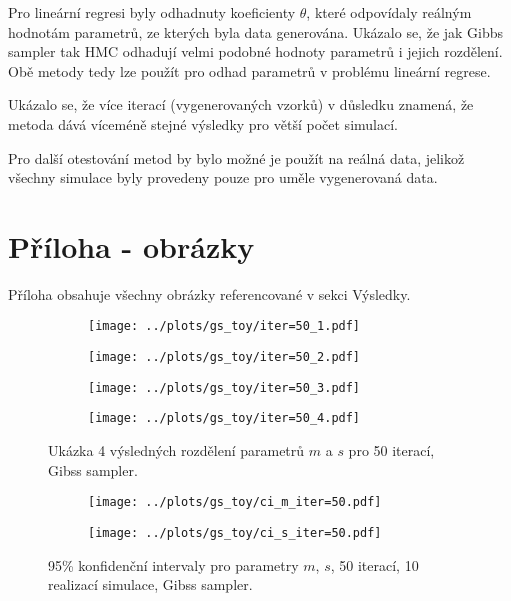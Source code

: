 \documentclass[11pt,oneside,american,czech]{article}
\begin{document}
Pro lineární regresi byly odhadnuty koeficienty $\theta$, které odpovídaly reálným hodnotám parametrů, ze kterých byla data generována. Ukázalo se, že jak Gibbs sampler tak HMC odhadují velmi podobné hodnoty parametrů i jejich rozdělení. Obě metody tedy lze použít pro odhad parametrů v problému lineární regrese.

Ukázalo se, že více iterací (vygenerovaných vzorků) v důsledku znamená, že metoda dává víceméně stejné výsledky pro větší počet simulací.

Pro další otestování metod by bylo možné je použít na reálná data, jelikož všechny simulace byly provedeny pouze pro uměle vygenerovaná data.

\newpage
\section{Příloha - obrázky}

Příloha obsahuje všechny obrázky referencované v sekci Výsledky.

\begin{figure}
	\centering
	\begin{subfigure}{0.45\textwidth}
		\centering
		\texttt{[image: ../plots/gs\_toy/iter=50\_1.pdf]}
	\end{subfigure}
	\hspace{0.5cm}
	\begin{subfigure}{0.45\textwidth}
		\centering
		\texttt{[image: ../plots/gs\_toy/iter=50\_2.pdf]}
	\end{subfigure}
	
	\vspace{2cm}
	
	\begin{subfigure}{0.45\textwidth}
		\centering
		\texttt{[image: ../plots/gs\_toy/iter=50\_3.pdf]}
	\end{subfigure}
	\hspace{0.5cm}
	\begin{subfigure}{0.45\textwidth}
		\centering
		\texttt{[image: ../plots/gs\_toy/iter=50\_4.pdf]}
	\end{subfigure}
	\caption{Ukázka 4 výsledných rozdělení parametrů $m$ a $s$ pro 50 iterací, Gibss sampler.}
	\label{Obr: GS toy 50}
\end{figure}

\begin{figure}
	\centering
	\begin{subfigure}{0.46\textwidth}
		\centering
		\texttt{[image: ../plots/gs\_toy/ci\_m\_iter=50.pdf]}
	\end{subfigure}
	\hspace{0.5cm}
	\begin{subfigure}{0.46\textwidth}
		\centering
		\texttt{[image: ../plots/gs\_toy/ci\_s\_iter=50.pdf]}
	\end{subfigure}
	\caption{95\% konfidenční intervaly pro parametry $m$, $s$, 50 iterací, 10 realizací simulace, Gibss sampler.}
	\label{GS toy 50 CI}
\end{figure}
\end{document}

